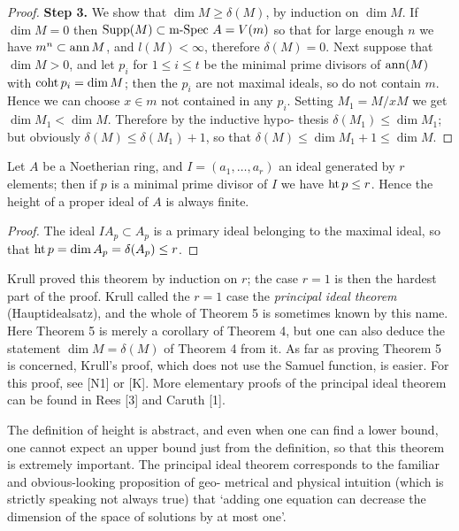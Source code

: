 \begin{proof}
\textbf{Step 3.} We show that $\dim M \ge \delta(M)$, by induction on $\dim M$. If $\dim M = 0$
then $\operatorname{Supp}(M) \subset \text{m-Spec } A = V(m)$ so that for large enough $n$ we have
$m^n \subset \operatorname{ann} M$, and $l(M) < \infty$, therefore $\delta(M) = 0$. Next suppose that
$\dim M > 0$, and let $p_i$ for $1 \le i \le t$ be the minimal prime divisors of $\operatorname{ann}(M)$
with $\operatorname{coht} p_i = \dim M$; then the $p_i$ are not maximal ideals, so do not contain
$m$. Hence we can choose $x \in m$ not contained in any $p_i$. Setting
$M_1 = M/xM$ we get $\dim M_1 < \dim M$. Therefore by the inductive hypo-
thesis $\delta(M_1) \le \dim M_1$; but obviously $\delta(M) \le \delta(M_1) + 1$, so that $\delta(M) \le
\dim M_1 + 1 \le \dim M$.
\end{proof}

\begin{theorem}\label{thm:13.5}
Let $A$ be a Noetherian ring, and $I = (a_1, \ldots, a_r)$ an ideal
generated by $r$ elements; then if $p$ is a minimal prime divisor of $I$ we have
$\operatorname{ht} p \le r$. Hence the height of a proper ideal of $A$ is always finite.
\end{theorem}

\begin{proof}
The ideal $IA_p \subset A_p$ is a primary ideal belonging to the maximal
ideal, so that $\operatorname{ht} p = \dim A_p = \delta(A_p) \le r$.
\end{proof}

\begin{remark}
Krull proved this theorem by induction on $r$; the case $r = 1$ is
then the hardest part of the proof. Krull called the $r = 1$ case the
\emph{principal ideal theorem} (Hauptidealsatz), and the whole of Theorem 5 is sometimes
known by this name. Here Theorem 5 is merely a corollary of Theorem 4,
but one can also deduce the statement $\dim M = \delta(M)$ of Theorem 4 from
it. As far as proving Theorem 5 is concerned, Krull's proof, which does
not use the Samuel function, is easier. For this proof, see [N1] or [K].
More elementary proofs of the principal ideal theorem can be found in
Rees [3] and Caruth [1].

The definition of height is abstract, and even when one can find a lower
bound, one cannot expect an upper bound just from the definition, so
that this theorem is extremely important. The principal ideal theorem
corresponds to the familiar and obvious-looking proposition of geo-
metrical and physical intuition (which is strictly speaking not always true)
that `adding one equation can decrease the dimension of the space of
solutions by at most one'.
\end{remark}

